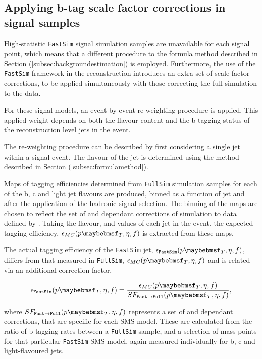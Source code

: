 \subsection{Applying b-tag scale factor corrections in signal samples}
\label{subsec:smsbtagreweighting}

High-statistic \texttt{FastSim} signal simulation samples are unavailable for each signal point, which means that a different procedure to the formula method described in Section (\ref{subsec:backgroundestimation}) is employed. Furthermore, the use of the \texttt{FastSim} framework in the reconstruction introduces an extra set of scale-factor corrections, to be applied simultaneously with those correcting the full-simulation to the data. 

For these signal models, an event-by-event re-weighting procedure is applied. This applied weight depends on both the flavour content and the b-tagging status of the reconstruction level jets in the event. 

The re-weighting procedure can be described by first considering a single jet within a signal event. The flavour of the jet is determined using the method described in Section (\ref{subsec:formulamethod}). 

Maps of tagging efficiencies determined from \texttt{FullSim} simulation samples for each of the b, c and light jet flavours are produced, binned as a function of jet \pt and \eta after the application of the hadronic signal selection. The binning of the maps are chosen to reflect the set of \pt and \eta dependant corrections of simulation to data defined by \cite{btagscalefactor}. Taking the flavour, \pt and \eta values of each jet in the event, the expected tagging efficiency, $\epsilon_{MC}(\pt,\eta,f)$ is extracted from these maps.

The actual tagging efficiency of the \texttt{FastSim} jet, $\epsilon_{\texttt{FastSim}}(\pt,\eta,f)$, differs from that measured in \texttt{FullSim},  $\epsilon_{MC}(\pt,\eta,f)$ and is related via an additional correction factor,

\begin{equation}
\epsilon_{\texttt{FastSim}}(\pt,\eta,f) =  \frac{\epsilon_{MC}(\pt,\eta,f)}{SF_{\texttt{Fast}\rightarrow\texttt{Full}}(\pt,\eta,f)} ,
\end{equation}

where $SF_{\texttt{Fast}\rightarrow\texttt{Full}}(\pt,\eta,f)$ represents a set of \pt and \eta dependant corrections, that are specific for each \ac{SMS} model. These are calculated from the ratio of b-tagging rates between a \texttt{FullSim} \ttbar sample, and a selection of mass points for that particular \texttt{FastSim} \ac{SMS} model, again measured individually for b, c and light-flavoured jets. 

